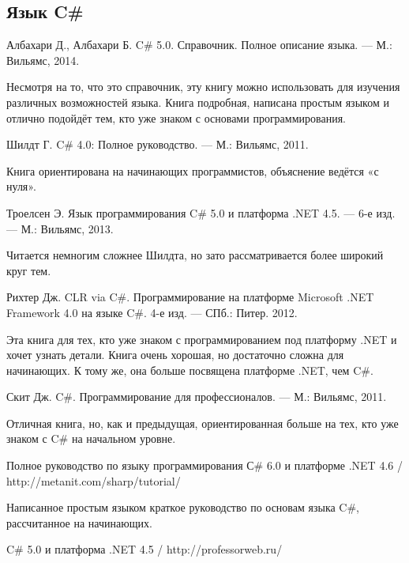 \begingroup
\renewcommand{\section}[2]{}%
\begin{thebibliography}{99}

  \subsection*{Язык C\#}

  Албахари Д., Албахари Б. C\# 5.0. Справочник. Полное описание
  языка. — М.: Вильямс, 2014.

  Несмотря на то, что это справочник, эту книгу можно использовать для
  изучения различных возможностей языка. Книга подробная, написана
  простым языком и отлично подойдёт тем, кто уже знаком с основами
  программирования.

  Шилдт Г. C\# 4.0: Полное руководство. — М.: Вильямс, 2011.

  Книга ориентирована на начинающих программистов, объяснение ведётся
  «с нуля».

  Троелсен Э. Язык программирования C\# 5.0 и платформа .NET 4.5. —
  6-е изд. — М.: Вильямс, 2013.

  Читается немногим сложнее Шилдта, но зато рассматривается более
  широкий круг тем.
  
  Рихтер Дж. CLR via C\#. Программирование на платформе Microsoft .NET Framework 4.0 на языке C\#. 4-е изд. — СПб.: Питер. 2012.

  Эта книга для тех, кто уже знаком с программированием под платформу
  .NET и хочет узнать детали. Книга очень хорошая, но достаточно
  сложна для начинающих. К тому же, она больше посвящена платформе
  .NET, чем C\#.

  Скит Дж. C\#. Программирование для профессионалов. — М.: Вильямс, 2011.

  Отличная книга, но, как и предыдущая, ориентированная больше на тех,
  кто уже знаком с C\# на начальном уровне.

  Полное руководство по языку программирования С\# 6.0 и платформе .NET 4.6 / http://metanit.com/sharp/tutorial/

  Написанное простым языком краткое руководство по основам языка C\#,
  рассчитанное на начинающих.

  C\# 5.0 и платформа .NET 4.5 / http://professorweb.ru/


\end{thebibliography}

